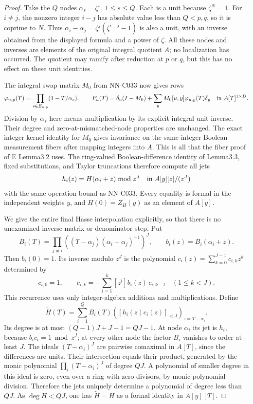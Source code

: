 \begin{proof}
Take the $Q$ nodes $\alpha_s=\zeta^s$, $1\leq s\leq Q$. Each is a unit because $\zeta^N=1$. For $i\ne j$, the nonzero integer $i-j$ has absolute value less than $Q<p,q$, so it is coprime to $N$. Thus
$\alpha_i-\alpha_j=\zeta^j(\zeta^{i-j}-1)$ is also a unit, with an inverse obtained from the displayed formula and a power of $\zeta$. All these nodes and inverses are elements of the original integral quotient $A$; no localization has occurred. The quotient may ramify after reduction at $p$ or $q$, but this has no effect on these unit identities.

The integral swap matrix $M_0$ from NN-C033 now gives rows
\[
 \varphi_{u,y}(T)=\prod_{s\in E_{u,y}}(1-T/\alpha_s),\qquad
 P_u(T)=\delta_u(I-M_0)+\sum_yM_0[u,y]\varphi_{u,y}(T)\delta_y
                             \quad\hbox{in }A[T]^{1\times D}.
\]
Division by $\alpha_s$ here means multiplication by its explicit integral unit inverse. Their degree and zero-at-mismatched-node properties are unchanged. The exact integer-kernel identity for $M_0$ gives invariance on the same integer Boolean measurement fibers after mapping integers into $A$. This is all that the fiber proof of E Lemma3.2 uses. The ring-valued Boolean-difference identity of Lemma3.3, fixed substitutions, and Taylor truncations therefore compute all jets
\[
                  h_i(z)=H(\alpha_i+z)\bmod z^J
                              \quad\hbox{in }A[y][z]/(z^J)
\]
with the same operation bound as NN-C033. Every equality is formal in the independent weights $y$, and $H(0)=Z_H(y)$ as an element of $A[y]$.

We give the entire final Hasse interpolation explicitly, so that there is no unexamined inverse-matrix or denominator step. Put
\[
 B_i(T)=\prod_{j\ne i}
             \left((T-\alpha_j)(\alpha_i-\alpha_j)^{-1}\right)^J,
 \qquad b_i(z)=B_i(\alpha_i+z).
\]
Then $b_i(0)=1$. Its inverse modulo $z^J$ is the polynomial
$c_i(z)=\sum_{k=0}^{J-1}c_{i,k}z^k$ determined by
\[
 c_{i,0}=1,\qquad
 c_{i,k}=-\sum_{l=1}^k[z^l]b_i(z)\,c_{i,k-l}\quad(1\leq k<J).
\]
This recurrence uses only integer-algebra additions and multiplications. Define
\[
 \widetilde H(T)=\sum_{i=1}^Q B_i(T)
      \left([h_i(z)c_i(z)]_{<J}\right)_{z=T-\alpha_i}.
\]
Its degree is at most $(Q-1)J+J-1=QJ-1$. At node $\alpha_i$ its jet is $h_i$, because $b_ic_i=1\bmod z^J$; at every other node the factor $B_i$ vanishes to order at least $J$. The ideals $(T-\alpha_i)^J$ are pairwise comaximal in $A[T]$, since the differences are units. Their intersection equals their product, generated by the monic polynomial $\prod_i(T-\alpha_i)^J$ of degree $QJ$. A polynomial of smaller degree in this ideal is zero, even over a ring with zero divisors, by monic polynomial division. Therefore the jets uniquely determine a polynomial of degree less than $QJ$. As $\deg H<QJ$, one has $\widetilde H=H$ as a formal identity in $A[y][T]$.


\end{proof}
